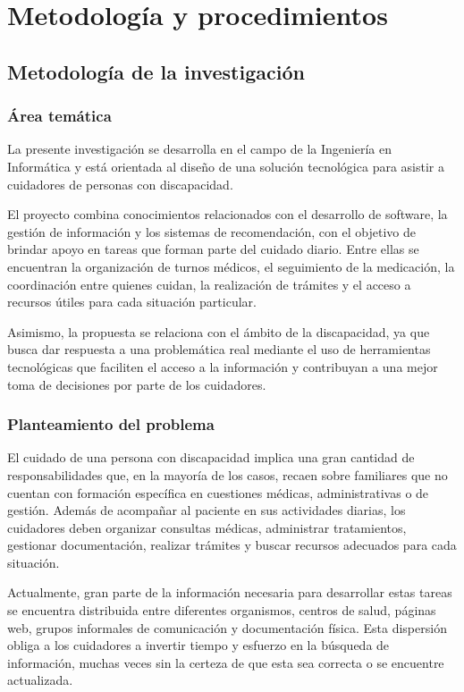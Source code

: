
\chapter{Metodología y procedimientos}\label{cap:metodologia}

\section{Metodología de la investigación}

\subsection{Área temática}

La presente investigación se desarrolla en el campo de la Ingeniería en Informática y está orientada al diseño de una solución tecnológica para asistir a cuidadores de personas con discapacidad.

El proyecto combina conocimientos relacionados con el desarrollo de software, la gestión de información y los sistemas de recomendación, con el objetivo de brindar apoyo en tareas que forman parte del cuidado diario. Entre ellas se encuentran la organización de turnos médicos, el seguimiento de la medicación, la coordinación entre quienes cuidan, la realización de trámites y el acceso a recursos útiles para cada situación particular.

Asimismo, la propuesta se relaciona con el ámbito de la discapacidad, ya que busca dar respuesta a una problemática real mediante el uso de herramientas tecnológicas que faciliten el acceso a la información y contribuyan a una mejor toma de decisiones por parte de los cuidadores.

\subsection{Planteamiento del problema}

El cuidado de una persona con discapacidad implica una gran cantidad de responsabilidades que, en la mayoría de los casos, recaen sobre familiares que no cuentan con formación específica en cuestiones médicas, administrativas o de gestión. Además de acompañar al paciente en sus actividades diarias, los cuidadores deben organizar consultas médicas, administrar tratamientos, gestionar documentación, realizar trámites y buscar recursos adecuados para cada situación.

Actualmente, gran parte de la información necesaria para desarrollar estas tareas se encuentra distribuida entre diferentes organismos, centros de salud, páginas web, grupos informales de comunicación y documentación física. Esta dispersión obliga a los cuidadores a invertir tiempo y esfuerzo en la búsqueda de información, muchas veces sin la certeza de que esta sea correcta o se encuentre actualizada.

